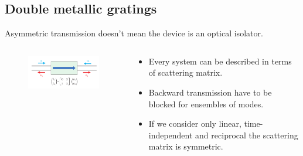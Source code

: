 \documentclass{beamer}
\begin{document}
\subsection{Double metallic gratings}
\begin{frame}
Asymmetric transmission doesn't mean the device is an optical isolator.
	\begin{columns}
	\begin{column}{.5\textwidth}
		\begin{figure}[htb]
			\includegraphics[width=\textwidth]{./images/simplest_isolator.png}\\
		\end{figure}
	\end{column}
	\begin{column}{.5\textwidth}
		\begin{itemize}
			\item Every system can be described in terms of scattering matrix.
			\item Backward transmission have to be blocked for ensembles of modes.
			\item If we consider only linear, time-independent and reciprocal the scattering matrix is symmetric.
			
		\end{itemize}
	\end{column}
	\end{columns}

{\tiny \cite{4171512}}
\end{frame}
\end{document}
